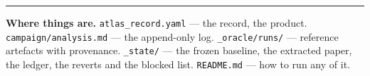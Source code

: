\documentclass[11pt,a4paper]{article}
\newcommand{\code}[1]{\texttt{#1}}
\begin{document}
\vspace{6pt}
\hrule
\vspace{6pt}
{\small\color{grey}
\textbf{Where things are.} \code{atlas\_record.yaml} --- the record, the product.
\code{campaign/analysis.md} --- the append-only log. \code{\_oracle/runs/} --- reference artefacts
with provenance. \code{\_state/} --- the frozen baseline, the extracted paper, the ledger, the
reverts and the blocked list. \code{README.md} --- how to run any of it.}
\end{document}
